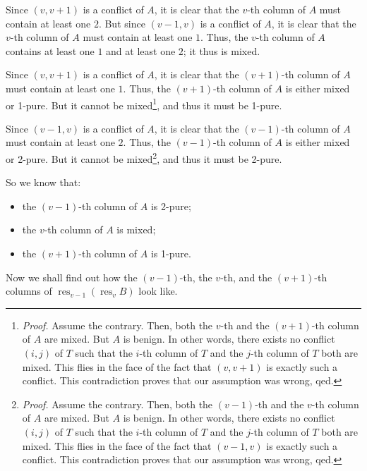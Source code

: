 \documentclass[numbers=enddot,12pt,final,onecolumn,notitlepage]{scrartcl}%
\theoremstyle{definition}
\begin{document}
Since $\left(  v,v+1\right)  $ is a conflict of $A$, it is clear that the
$v$-th column of $A$ must contain at least one $2$. But since $\left(
v-1,v\right)  $ is a conflict of $A$, it is clear that the $v$-th column of
$A$ must contain at least one $1$. Thus, the $v$-th column of $A$ contains at
least one $1$ and at least one $2$; it thus is mixed.

Since $\left(  v,v+1\right)  $ is a conflict of $A$, it is clear that the
$\left(  v+1\right)  $-th column of $A$ must contain at least one $1$. Thus,
the $\left(  v+1\right)  $-th column of $A$ is either mixed or 1-pure. But it
cannot be mixed\footnote{\textit{Proof.} Assume the contrary. Then, both the
$v$-th and the $\left(  v+1\right)  $-th column of $A$ are mixed. But $A$ is
benign. In other words, there exists no conflict $\left(  i,j\right)  $ of $T$
such that the $i$-th column of $T$ and the $j$-th column of $T$ both are
mixed. This flies in the face of the fact that $\left(  v,v+1\right)  $ is
exactly such a conflict. This contradiction proves that our assumption was
wrong, qed.}, and thus it must be 1-pure.

Since $\left(  v-1,v\right)  $ is a conflict of $A$, it is clear that the
$\left(  v-1\right)  $-th column of $A$ must contain at least one $2$. Thus,
the $\left(  v-1\right)  $-th column of $A$ is either mixed or 2-pure. But it
cannot be mixed\footnote{\textit{Proof.} Assume the contrary. Then, both the
$\left(  v-1\right)  $-th and the $v$-th column of $A$ are mixed. But $A$ is
benign. In other words, there exists no conflict $\left(  i,j\right)  $ of $T$
such that the $i$-th column of $T$ and the $j$-th column of $T$ both are
mixed. This flies in the face of the fact that $\left(  v-1,v\right)  $ is
exactly such a conflict. This contradiction proves that our assumption was
wrong, qed.}, and thus it must be 2-pure.

So we know that:

\begin{itemize}
\item the $\left(  v-1\right)  $-th column of $A$ is 2-pure;

\item the $v$-th column of $A$ is mixed;

\item the $\left(  v+1\right)  $-th column of $A$ is 1-pure.
\end{itemize}

Now we shall find out how the $\left(  v-1\right)  $-th, the $v$-th, and the
$\left(  v+1\right)  $-th columns of $\operatorname*{res}\nolimits_{v-1}%
\left(  \operatorname*{res}\nolimits_{v}B\right)  $ look like.
\end{document}
